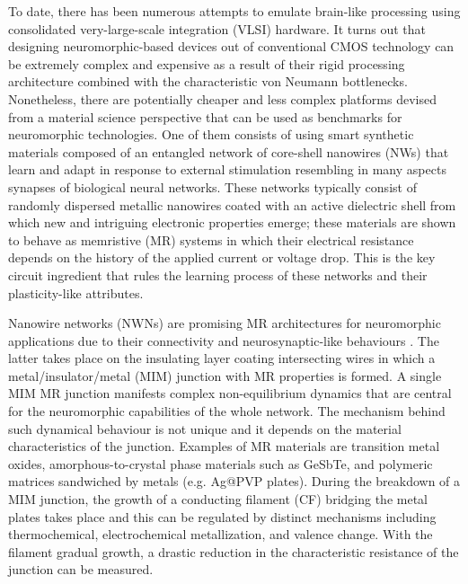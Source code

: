 To date, there has been numerous attempts to emulate brain-like processing using consolidated very-large-scale integration (VLSI) hardware\cite{indiveri2013}. It turns out that designing neuromorphic-based devices out of conventional CMOS technology can be extremely complex and expensive as a result of their rigid processing architecture combined with the characteristic von Neumann bottlenecks. Nonetheless, there are potentially cheaper and less complex platforms devised from a material science perspective that can be used as benchmarks for neuromorphic technologies. One of them consists of using smart synthetic materials composed of an entangled network of core-shell nanowires (NWs) that learn and adapt in response to external stimulation resembling in many aspects synapses of biological neural networks\cite{nirmalraj2012,demis2016,sillin2013}. These networks typically consist of randomly dispersed metallic nanowires coated with an active dielectric shell from which new and intriguing electronic properties emerge; these materials are shown to behave as memristive (MR) systems in which their electrical resistance depends on the history of the applied current or voltage drop\cite{chua1971,memristors2014}. This is the key circuit ingredient that rules the learning process of these networks and their plasticity-like attributes. 

Nanowire networks (NWNs) are promising MR architectures for neuromorphic applications due to their connectivity and neurosynaptic-like behaviours \cite{nirmalraj2012,kelly2016,jo2010}. The latter takes place on the insulating layer coating intersecting wires in which a metal/insulator/metal (MIM) junction with MR properties is formed. A single MIM MR junction manifests complex non-equilibrium dynamics that are central for the neuromorphic capabilities of the whole network. The mechanism behind such dynamical behaviour is not unique and it depends  on the material characteristics of the junction. Examples of MR materials \cite{yang2013} are transition metal oxides, amorphous-to-crystal phase materials such as GeSbTe, and polymeric matrices sandwiched by metals (e.g. Ag@PVP plates). During the breakdown of a MIM junction, the growth of a conducting filament (CF) bridging the metal plates takes place and this can be regulated by distinct mechanisms \cite{memristors2014,lim2015,jeong2012, } including thermochemical, electrochemical metallization, and valence change. With the filament gradual growth, a drastic reduction in the characteristic resistance of the junction can be measured. 

